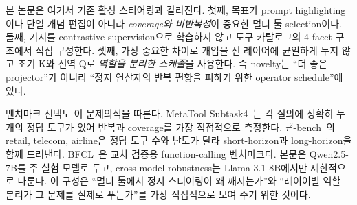 본 논문은 여기서 기존 활성 스티어링과 갈라진다. 첫째, 목표가 prompt highlighting이나 단일 개념 편집이 아니라 \emph{coverage와 비반복성}이 중요한 멀티-툴 selection이다. 둘째, 기저를 contrastive supervision으로 학습하지 않고 도구 카탈로그의 4-facet 구조에서 직접 구성한다. 셋째, 가장 중요한 차이로 개입을 전 레이어에 균일하게 두지 않고 초기 K와 전역 Q로 \emph{역할을 분리한 스케줄}을 사용한다. 즉 novelty는 ``더 좋은 projector''가 아니라 ``정지 연산자의 반복 편향을 피하기 위한 operator schedule''에 있다.

벤치마크 선택도 이 문제의식을 따른다. MetaTool Subtask4~\citep{MetaTool}는 각 질의에 정확히 두 개의 정답 도구가 있어 반복과 coverage를 가장 직접적으로 측정한다. $\tau^2$-bench~\citep{tau2bench}의 retail, telecom, airline은 정답 도구 수와 난도가 달라 short-horizon과 long-horizon을 함께 드러낸다. BFCL~\citep{BFCL}은 교차 검증용 function-calling 벤치마크다. 본문은 Qwen2.5-7B를 주 실험 모델로 두고, cross-model robustness는 Llama-3.1-8B에서만 제한적으로 다룬다. 이 구성은 ``멀티-툴에서 정지 스티어링이 왜 깨지는가''와 ``레이어별 역할 분리가 그 문제를 실제로 푸는가''를 가장 직접적으로 보여 주기 위한 것이다.

